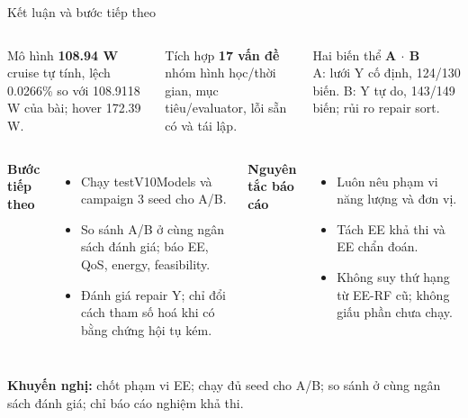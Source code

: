 \documentclass[t,aspectratio=169]{beamer}
\newcommand{\hb}[1]{{\color{hustprimary}\textbf{#1}}}
\newcommand{\code}[1]{{\small\ttfamily #1}}
\begin{document}
\begin{frame}{Kết luận và bước tiếp theo}
  \begin{columns}[T]
  \begin{block}{Mô hình}\scriptsize
  {\Large\bfseries\color{hustprimary} 108.94 W}\\[2pt]
  cruise tự tính, lệch 0.0266\% so với 108.9118 W của bài; hover 172.39 W.
  \end{block}
  \begin{block}{Tích hợp}\scriptsize
  {\Large\bfseries\color{hustprimary} 17 vấn đề}\\[2pt]
  nhóm hình học/thời gian, mục tiêu/evaluator, lỗi sẵn có và tái lập.
  \end{block}
  \begin{alertblock}{Hai biến thể}\scriptsize
  {\Large\bfseries\color{hred} A $\cdot$ B}\\[2pt]
  A: lưới Y cố định, 124/130 biến. B: Y tự do, 143/149 biến; rủi ro repair \code{sort}.
  \end{alertblock}
  \end{columns}
  \vspace{4pt}
  \begin{columns}[T]
  \small
  \hb{Bước tiếp theo}
  \begin{itemize}\scriptsize
    \item Chạy \code{testV10Models} và campaign 3 seed cho A/B.
    \item So sánh A/B ở cùng ngân sách đánh giá; báo EE, QoS, energy, feasibility.
    \item Đánh giá repair Y; chỉ đổi cách tham số hoá khi có bằng chứng hội tụ kém.
  \end{itemize}
  \small
  \hb{Nguyên tắc báo cáo}
  \begin{itemize}\scriptsize
    \item Luôn nêu phạm vi năng lượng và đơn vị.
    \item Tách EE khả thi và EE chẩn đoán.
    \item Không suy thứ hạng từ EE-RF cũ; không giấu phần chưa chạy.
  \end{itemize}
  \end{columns}
  \vspace{2pt}
  {\small\hb{Khuyến nghị:}} {\scriptsize chốt phạm vi EE; chạy đủ seed cho A/B; so sánh ở cùng ngân sách đánh giá; chỉ báo cáo nghiệm khả thi.}
\end{frame}
\end{document}
